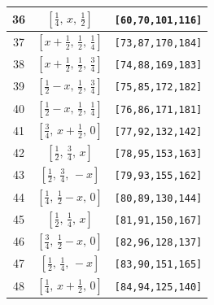 \documentclass[fleqn,8pt]{jsarticle}
\begin{document}
\begin{longtable}{ccc}
36 & $\left[ \frac{1}{4},\, x,\, \frac{1}{2} \right]$ & {\tt [60,70,101,116]} \\ \hline
37 & $\left[ x + \frac{1}{2},\, \frac{1}{2},\, \frac{1}{4} \right]$ & {\tt [73,87,170,184]} \\ \hline
38 & $\left[ x + \frac{1}{2},\, \frac{1}{2},\, \frac{3}{4} \right]$ & {\tt [74,88,169,183]} \\ \hline
39 & $\left[ \frac{1}{2} - x,\, \frac{1}{2},\, \frac{3}{4} \right]$ & {\tt [75,85,172,182]} \\ \hline
40 & $\left[ \frac{1}{2} - x,\, \frac{1}{2},\, \frac{1}{4} \right]$ & {\tt [76,86,171,181]} \\ \hline
41 & $\left[ \frac{3}{4},\, x + \frac{1}{2},\, 0 \right]$ & {\tt [77,92,132,142]} \\ \hline
42 & $\left[ \frac{1}{2},\, \frac{3}{4},\, x \right]$ & {\tt [78,95,153,163]} \\ \hline
43 & $\left[ \frac{1}{2},\, \frac{3}{4},\, - x \right]$ & {\tt [79,93,155,162]} \\ \hline
44 & $\left[ \frac{1}{4},\, \frac{1}{2} - x,\, 0 \right]$ & {\tt [80,89,130,144]} \\ \hline
45 & $\left[ \frac{1}{2},\, \frac{1}{4},\, x \right]$ & {\tt [81,91,150,167]} \\ \hline
46 & $\left[ \frac{3}{4},\, \frac{1}{2} - x,\, 0 \right]$ & {\tt [82,96,128,137]} \\ \hline
47 & $\left[ \frac{1}{2},\, \frac{1}{4},\, - x \right]$ & {\tt [83,90,151,165]} \\ \hline
48 & $\left[ \frac{1}{4},\, x + \frac{1}{2},\, 0 \right]$ & {\tt [84,94,125,140]} \\
\end{longtable}
\renewcommand{\arraystretch}{1.2}
\end{document}
